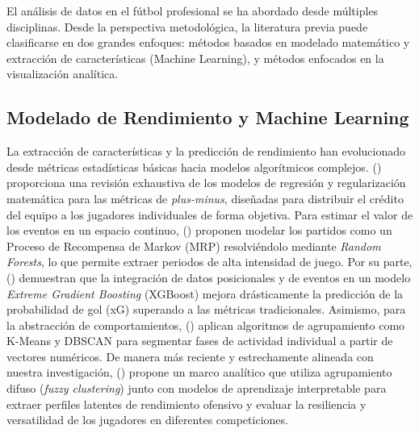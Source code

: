 \documentclass[conference]{IEEEtran}
\begin{document}
El análisis de datos en el fútbol profesional se ha abordado desde múltiples disciplinas. Desde la perspectiva metodológica, la literatura previa puede clasificarse en dos grandes enfoques: métodos basados en modelado matemático y extracción de características (Machine Learning), y métodos enfocados en la visualización analítica. 

\subsection{Modelado de Rendimiento y Machine Learning}
La extracción de características y la predicción de rendimiento han evolucionado desde métricas estadísticas básicas hacia modelos algorítmicos complejos. \citeauthor{hvattum2019comprehensive} (\citeyear{hvattum2019comprehensive}) proporciona una revisión exhaustiva de los modelos de regresión y regularización matemática para las métricas de \textit{plus-minus}, diseñadas para distribuir el crédito del equipo a los jugadores individuales de forma objetiva. Para estimar el valor de los eventos en un espacio continuo, \citeauthor{zhao2017visual} (\citeyear{zhao2017visual}) proponen modelar los partidos como un Proceso de Recompensa de Markov (MRP) resolviéndolo mediante \textit{Random Forests}, lo que permite extraer periodos de alta intensidad de juego. Por su parte, \citeauthor{anzer2021goal} (\citeyear{anzer2021goal}) demuestran que la integración de datos posicionales y de eventos en un modelo \textit{Extreme Gradient Boosting} (XGBoost) mejora drásticamente la predicción de la probabilidad de gol (xG) superando a las métricas tradicionales. Asimismo, para la abstracción de comportamientos, \citeauthor{janetzko2014feature} (\citeyear{janetzko2014feature}) aplican algoritmos de agrupamiento como K-Means y DBSCAN para segmentar fases de actividad individual a partir de vectores numéricos. De manera más reciente y estrechamente alineada con nuestra investigación, \citeauthor{pacifico2025fuzzy} (\citeyear{pacifico2025fuzzy}) propone un marco analítico que utiliza agrupamiento difuso (\textit{fuzzy clustering}) junto con modelos de aprendizaje interpretable para extraer perfiles latentes de rendimiento ofensivo y evaluar la resiliencia y versatilidad de los jugadores en diferentes competiciones.
\end{document}
